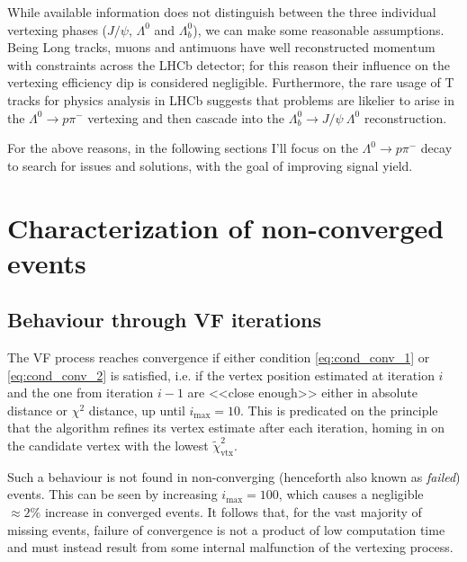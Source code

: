 While available information does not distinguish between the three individual vertexing phases ($J/\psi$, $\Lambda^0$ and $\Lambda_b^0$), we can make some reasonable assumptions.
Being Long tracks, muons and antimuons have well reconstructed momentum with constraints across the LHCb detector;
for this reason their influence on the vertexing efficiency dip is considered negligible.
Furthermore, the rare usage of T tracks for physics analysis in LHCb suggests that problems are likelier to arise in the $\Lambda^0 \rightarrow p\pi^-$ vertexing and then cascade into the $\Lambda_b^0 \rightarrow J/\psi~\Lambda^0$ reconstruction.

For the above reasons, in the following sections I'll focus on the $\Lambda^0 \rightarrow p\pi^-$ decay to search for issues and solutions, with the goal of improving signal yield.


\section{Characterization of non-converged events}
\label{sec:characterization_non_converged}

\subsection{Behaviour through VF iterations}
\label{sec:oscillation}
The VF process reaches convergence if either condition \eqref{eq:cond_conv_1} or \eqref{eq:cond_conv_2} is satisfied, i.e. if the vertex position estimated at iteration $i$ and the one from iteration $i-1$ are <<close enough>> either in absolute distance or $\chi^2$ distance, up until $i_\text{max} = 10$.
This is predicated on the principle that the algorithm refines its vertex estimate after each iteration, homing in on the candidate vertex with the lowest $\tilde{\chi}^2_\text{vtx}$.

Such a behaviour is not found in non-converging (henceforth also known as \textit{failed}) events.
This can be seen by increasing $i_\text{max}=100$, which causes a negligible $\approx 2\%$ increase in converged events.
It follows that, for the vast majority of missing events, failure of convergence is not a product of low computation time and must instead result from some internal malfunction of the vertexing process.

